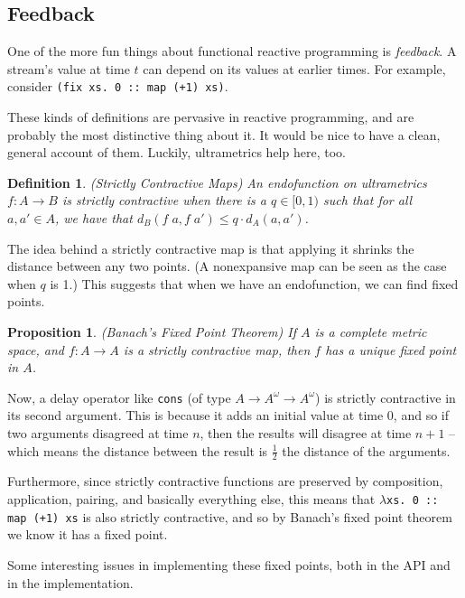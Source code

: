 \documentclass{article}
\newtheorem{prop}{Proposition}
\newtheorem{definition}{Definition}
\begin{document}
\subsection{Feedback}

One of the more fun things about functional reactive programming is \emph{feedback}. A stream's value at
time $t$ can depend on its values at earlier times. For example, consider \texttt{(fix xs. 0 :: map (+1) xs)}. 

These kinds of definitions are pervasive in reactive programming, and are probably the most distinctive
thing about it. It would be nice to have a clean, general account of them. Luckily, ultrametrics help here,
too. 

\begin{definition}{(Strictly Contractive Maps)}
  An endofunction on ultrametrics $f : A \to B$ is \emph{strictly contractive} when there is a $q \in [0,1)$
  such that for all $a, a' \in A$, we have that $d_B(f\;a, f\;a') \leq q \cdot d_A(a, a')$. 
\end{definition}

The idea behind a strictly contractive map is that applying it shrinks
the distance between any two points. (A nonexpansive map can be seen as the case when $q$ is 1.)
This suggests that when we have an endofunction, we can find fixed points. 

\begin{prop}{(Banach's Fixed Point Theorem)}
If $A$ is a complete metric space, and $f : A \to A$ is a strictly contractive map, then $f$ has a
\emph{unique} fixed point in $A$. 
\end{prop}

Now, a delay operator like \texttt{cons} (of type $A \to A^\omega \to
A^\omega$) is strictly contractive in its second argument. This is
because it adds an initial value at time 0, and so if two arguments disagreed at
time $n$, then the results will disagree at time $n+1$ -- which means the distance
between the result is  $\frac{1}{2}$ the distance of the arguments. 

Furthermore, since strictly contractive functions are preserved by
composition, application, pairing, and basically everything else, this
means that \texttt{$\lambda$xs. 0 :: map (+1) xs} is also strictly
contractive, and so by Banach's fixed point theorem we know it has a
fixed point.

Some interesting issues in implementing these fixed points, both in
the API and in the implementation. 
\end{document}
